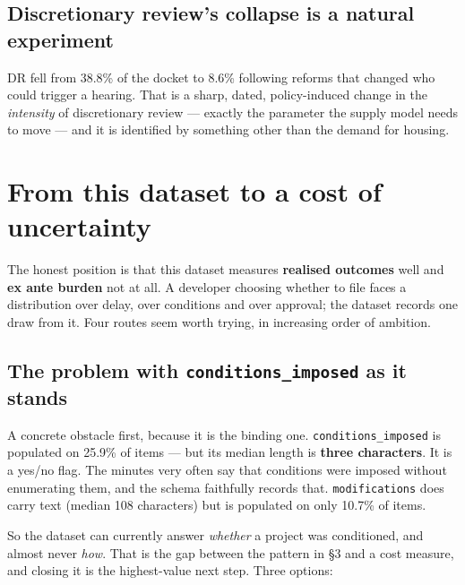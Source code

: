 \documentclass[11pt]{article}
\begin{document}
\subsection{Discretionary review's collapse is a natural experiment}

DR fell from 38.8\% of the docket to 8.6\% following reforms that changed who could trigger a
hearing. That is a sharp, dated, policy-induced change in the \emph{intensity} of discretionary
review --- exactly the parameter the supply model needs to move --- and it is identified by
something other than the demand for housing.

\section{From this dataset to a cost of uncertainty}
\label{sec:uncertainty}

The honest position is that this dataset measures \textbf{realised outcomes} well and
\textbf{ex ante burden} not at all. A developer choosing whether to file faces a distribution
over delay, over conditions and over approval; the dataset records one draw from it. Four
routes seem worth trying, in increasing order of ambition.

\subsection{The problem with \texttt{conditions\_imposed} as it stands}

A concrete obstacle first, because it is the binding one. \texttt{conditions\_imposed} is
populated on 25.9\% of items --- but its median length is \textbf{three characters}. It is a
yes/no flag. The minutes very often say that conditions were imposed without enumerating them,
and the schema faithfully records that. \texttt{modifications} does carry text (median 108
characters) but is populated on only 10.7\% of items.

So the dataset can currently answer \emph{whether} a project was conditioned, and almost never
\emph{how}. That is the gap between the pattern in \S3 and a cost measure, and closing it is
the highest-value next step. Three options:
\end{document}

